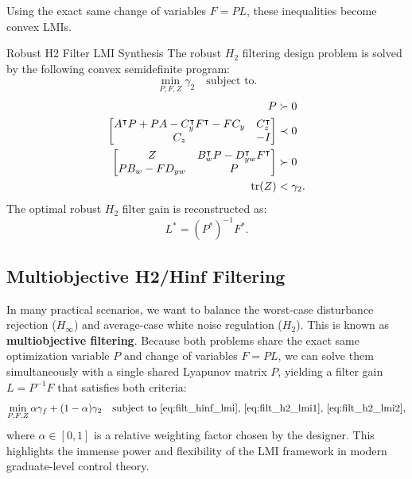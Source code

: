 Using the exact same change of variables $F = P L$, these inequalities become convex LMIs.

\begin{mytheorem}{Robust H2 Filter LMI Synthesis}
The robust $H_2$ filtering design problem is solved by the following convex semidefinite program:
\begin{equation}
\min_{P, F, Z} \gamma_2 \quad \text{subject to} .
\end{equation}
\begin{align}
    P &\succ 0 \\
    \begin{bmatrix} A^\intercal P + P A - C_y^\intercal F^\intercal - F C_y & C_z^\intercal \\ C_z & -I \end{bmatrix} &\prec 0 \label{eq:filt_h2_lmi1} \\
    \begin{bmatrix} Z & B_w^\intercal P - D_{yw}^\intercal F^\intercal \\ P B_w - F D_{yw} & P \end{bmatrix} &\succ 0 \label{eq:filt_h2_lmi2} \\
\operatorname{tr}(Z) &< \gamma_2 .
\end{align}
The optimal robust $H_2$ filter gain is reconstructed as:
\begin{equation}
L^* = (P^*)^{-1} F^* .
\end{equation}
\end{mytheorem}

\subsection{Multiobjective H2/Hinf Filtering}
In many practical scenarios, we want to balance the worst-case disturbance rejection ($H_\infty$) and average-case white noise regulation ($H_2$). This is known as \textbf{multiobjective filtering}. Because both problems share the exact same optimization variable $P$ and change of variables $F = P L$, we can solve them simultaneously with a single shared Lyapunov matrix $P$, yielding a filter gain $L = P^{-1}F$ that satisfies both criteria:
\begin{equation}
\min_{P, F, Z} \alpha \gamma_f + (1-\alpha) \gamma_2 \quad \text{subject to } \text{\eqref{eq:filt_hinf_lmi}, \eqref{eq:filt_h2_lmi1}, \eqref{eq:filt_h2_lmi2}} ,
\end{equation}
where $\alpha \in [0, 1]$ is a relative weighting factor chosen by the designer. This highlights the immense power and flexibility of the LMI framework in modern graduate-level control theory.
